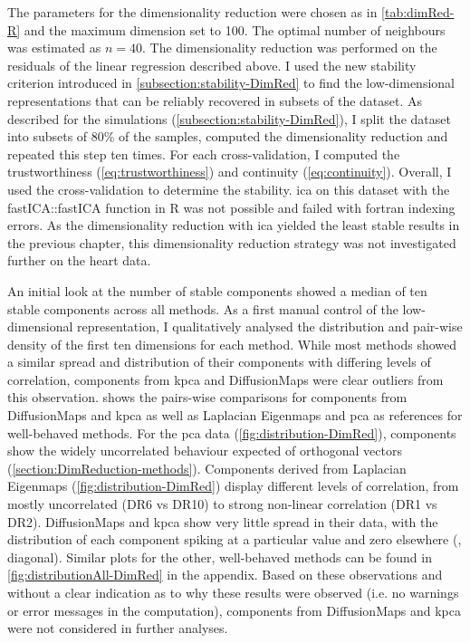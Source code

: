 The parameters for the dimensionality reduction were chosen as in \cref{tab:dimRed-R} and the maximum dimension set to \num{100}. The optimal number of neighbours was estimated as \(n=40\).  The dimensionality reduction was performed on the residuals of the linear regression described above. I used the new stability criterion introduced in \cref{subsection:stability-DimRed} to find the low-dimensional representations that can be reliably recovered in subsets of the dataset. 
As described for the simulations (\cref{subsection:stability-DimRed}), I split the dataset into subsets of \num{80}\% of the samples, computed the dimensionality reduction and repeated this step ten times. For each cross-validation, I computed the trustworthiness (\cref{eq:trustworthiness}) and continuity (\cref{eq:continuity}). Overall, I used the cross-validation to determine the stability. \gls{ica} on this dataset with the fastICA::fastICA function in R was not possible and failed with fortran indexing errors. As the dimensionality reduction with \gls{ica} yielded the least stable results in the previous chapter, this dimensionality reduction strategy was not investigated further on the heart data.  

An initial look at the number of stable components showed a median of ten stable components across all methods. As a first manual control of the low-dimensional representation, I qualitatively analysed the distribution and pair-wise density of the first ten dimensions for each method. While most methods showed a similar spread and distribution of their components with differing levels of correlation, components from \gls{kpca} and DiffusionMaps were clear outliers from this observation.  shows the pairs-wise comparisons for components from DiffusionMaps and \gls{kpca} as well as Laplacian Eigenmaps and \gls{pca} as references for well-behaved methods. For the \gls{pca} data (\cref{fig:distribution-DimRed}), components show the widely uncorrelated behaviour expected of orthogonal vectors (\cref{section:DimReduction-methods}). Components derived from Laplacian Eigenmaps (\cref{fig:distribution-DimRed}) display different levels of correlation, from mostly uncorrelated (DR6 vs DR10) to strong non-linear correlation (DR1 vs DR2). DiffusionMaps and \gls{kpca} show very little spread in their data, with the distribution of each component spiking at a particular value and zero elsewhere (, diagonal). Similar plots for the other, well-behaved methods can be found in \cref{fig:distributionAll-DimRed} in the appendix. Based on these observations and without a clear indication as to why these results were observed (i.e. no warnings or error messages in the computation), components from DiffusionMaps and \gls{kpca} were not considered in further analyses. 


